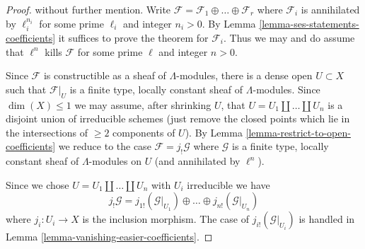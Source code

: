 \documentclass[10pt,a4paper]{amsart}
\theoremstyle{plain}
\theoremstyle{definition}
\theoremstyle{remark}
\numberwithin{equation}{subsection}
\begin{document}
\begin{proof}
without further mention.
Write $\mathcal{F} = \mathcal{F}_1 \oplus \ldots \oplus \mathcal{F}_r$
where $\mathcal{F}_i$ is annihilated by $\ell_i^{n_i}$
for some prime $\ell_i$ and integer $n_i > 0$.
By Lemma \ref{lemma-ses-statements-coefficients} it suffices
to prove the theorem for $\mathcal{F}_i$. Thus we may and do
assume that $\ell^n$ kills $\mathcal{F}$ for some prime $\ell$
and integer $n > 0$.

\medskip\noindent
Since $\mathcal{F}$ is constructible as a sheaf of $\Lambda$-modules,
there is a dense open $U \subset X$ such that $\mathcal{F}|_U$ is a
finite type, locally constant sheaf of $\Lambda$-modules.
Since $\dim(X) \leq 1$ we may assume, after shrinking $U$, that
$U = U_1 \amalg \ldots \amalg U_n$ is a disjoint union of irreducible
schemes (just remove the closed points which lie in the intersections
of $\geq 2$ components of $U$). By
Lemma \ref{lemma-restrict-to-open-coefficients}
we reduce to the case
$\mathcal{F} = j_!\mathcal{G}$ where $\mathcal{G}$ is a finite type,
locally constant sheaf of $\Lambda$-modules on $U$ (and annihilated
by $\ell^n$).

\medskip\noindent
Since we chose $U = U_1 \amalg \ldots \amalg U_n$ with $U_i$ irreducible
we have
$$
j_!\mathcal{G} =
j_{1!}(\mathcal{G}|_{U_1}) \oplus \ldots \oplus
j_{n!}(\mathcal{G}|_{U_n})
$$
where $j_i : U_i \to X$ is the inclusion morphism.
The case of $j_{i!}(\mathcal{G}|_{U_i})$ is handled in
Lemma \ref{lemma-vanishing-easier-coefficients}.
\end{proof}
\end{document}
